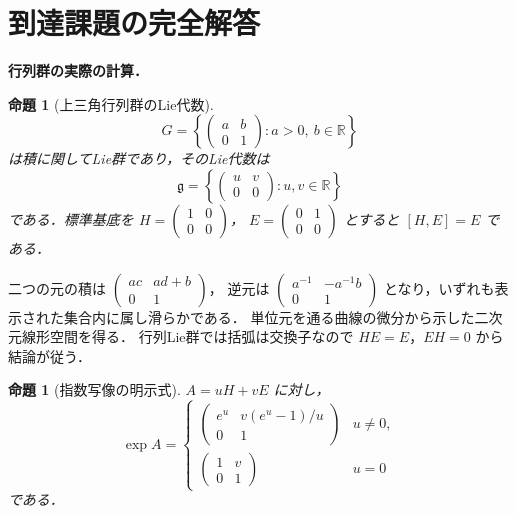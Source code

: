 \documentclass[a5paper,10pt,onecolumn]{jsarticle}
\makeatletter
\theoremstyle{mathnotetheorem}
\newtheorem{proposition}[theorem]{命題}
\renewcommand{\proofname}{証明}
\renewenvironment{proof}[1][\proofname]{%
  \par\pushQED{\qed}\normalfont\topsep4\p@\@plus2\p@\relax
  \trivlist\item[\hskip\labelsep\bfseries #1]\ignorespaces
}{\popQED\endtrivlist\@endpefalse}
\makeatother
\begin{document}
\section{到達課題の完全解答}
\noindent\textbf{行列群の実際の計算．}
\begin{proposition}[上三角行列群のLie代数]
\[
G=\left\{\begin{pmatrix}a&b\\0&1\end{pmatrix}:
a>0,\ b\in\mathbb R\right\}
\]
は積に関してLie群であり，そのLie代数は
\[
\mathfrak g=\left\{\begin{pmatrix}u&v\\0&0\end{pmatrix}:
u,v\in\mathbb R\right\}
\]
である．標準基底を
$H=\left(\begin{smallmatrix}1&0\\0&0\end{smallmatrix}\right)$，
$E=\left(\begin{smallmatrix}0&1\\0&0\end{smallmatrix}\right)$
とすると $[H,E]=E$ である．
\end{proposition}
\begin{proof}
二つの元の積は
$\left(\begin{smallmatrix}ac&ad+b\\0&1\end{smallmatrix}\right)$，
逆元は
$\left(\begin{smallmatrix}a^{-1}&-a^{-1}b\\0&1\end{smallmatrix}\right)$
となり，いずれも表示された集合内に属し滑らかである．
単位元を通る曲線の微分から示した二次元線形空間を得る．
行列Lie群では括弧は交換子なので
$HE=E$，$EH=0$ から結論が従う．
\end{proof}
\begin{proposition}[指数写像の明示式]
$A=uH+vE$ に対し，
\[
\exp A=
\begin{cases}
\left(\begin{smallmatrix}
e^u&v(e^u-1)/u\\0&1
\end{smallmatrix}\right)&u\ne0,\\[2mm]
\left(\begin{smallmatrix}1&v\\0&1\end{smallmatrix}\right)&u=0
\end{cases}
\]
である．
\end{proposition}
\end{document}
